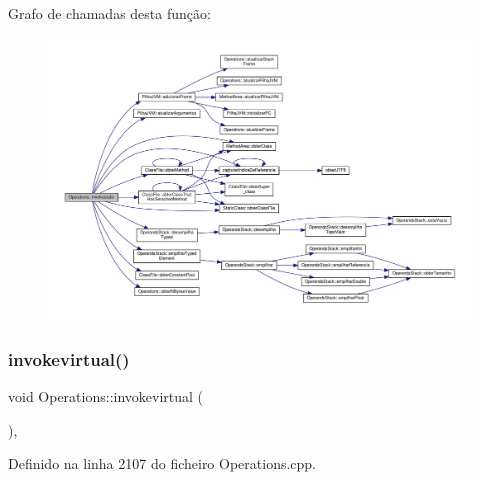 Grafo de chamadas desta função\+:\nopagebreak
\begin{figure}[H]
\begin{center}
\leavevmode
\includegraphics[width=350pt]{classOperations_a562d8c9cc5975de2ee6d1a95e1969724_cgraph}
\end{center}
\end{figure}
\mbox{\label{classOperations_acf53d7e184b8828702b4d5036ef0a7a9}} 
\subsubsection{\texorpdfstring{invokevirtual()}{invokevirtual()}}
{\footnotesize\ttfamily void Operations\+::invokevirtual (\begin{DoxyParamCaption}{ }\end{DoxyParamCaption})\hspace{0.3cm}{\ttfamily [static]}, {\ttfamily [private]}}



Definido na linha 2107 do ficheiro Operations.\+cpp.



